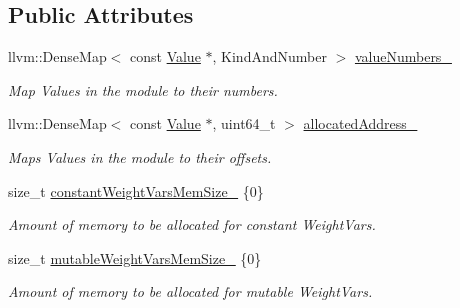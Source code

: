 \subsection*{Public Attributes}
\begin{DoxyCompactItemize}
\item 
\mbox{\label{structglow_1_1_allocations_info_a29c6b600568a9cdf1b3cab12cc119cdb}} 
llvm\+::\+Dense\+Map$<$ const \hyperlink{classglow_1_1_value}{Value} $\ast$, Kind\+And\+Number $>$ \hyperlink{structglow_1_1_allocations_info_a29c6b600568a9cdf1b3cab12cc119cdb}{value\+Numbers\+\_\+}
\begin{DoxyCompactList}\small\item\em Map Values in the module to their numbers. \end{DoxyCompactList}\item 
llvm\+::\+Dense\+Map$<$ const \hyperlink{classglow_1_1_value}{Value} $\ast$, uint64\+\_\+t $>$ \hyperlink{structglow_1_1_allocations_info_a7b605a7c7f6ed12f2c3f6f7e41d2784d}{allocated\+Address\+\_\+}
\begin{DoxyCompactList}\small\item\em Maps Values in the module to their offsets. \end{DoxyCompactList}\item 
\mbox{\label{structglow_1_1_allocations_info_a2b7ee050f49840b2f7bf5bca1dde9cd6}} 
size\+\_\+t \hyperlink{structglow_1_1_allocations_info_a2b7ee050f49840b2f7bf5bca1dde9cd6}{constant\+Weight\+Vars\+Mem\+Size\+\_\+} \{0\}
\begin{DoxyCompactList}\small\item\em Amount of memory to be allocated for constant Weight\+Vars. \end{DoxyCompactList}\item 
\mbox{\label{structglow_1_1_allocations_info_a794aef665b80b8558b1b2aaaf91a1bf8}} 
size\+\_\+t \hyperlink{structglow_1_1_allocations_info_a794aef665b80b8558b1b2aaaf91a1bf8}{mutable\+Weight\+Vars\+Mem\+Size\+\_\+} \{0\}
\begin{DoxyCompactList}\small\item\em Amount of memory to be allocated for mutable Weight\+Vars. \end{DoxyCompactList}\item 
\mbox{\label{structglow_1_1_allocations_info_ac74c0edfcde078694c009f1e21bd1baf}} 

\end{DoxyCompactItemize}
